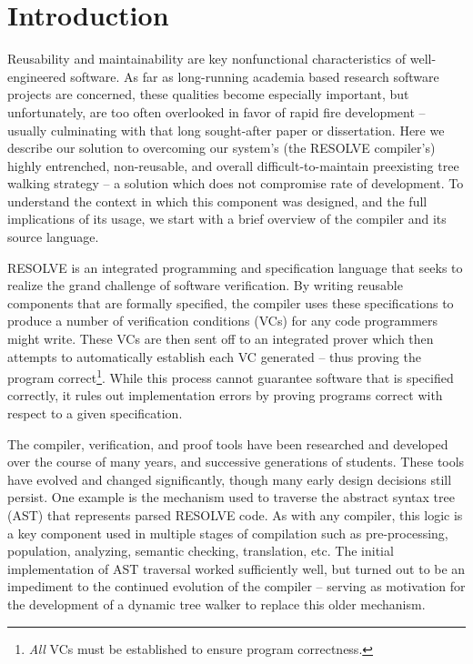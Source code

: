 \documentclass[times]{speauth}
\begin{document}

\section{Introduction}
\vspace{-2pt}
Reusability and maintainability are key nonfunctional characteristics of well-engineered software. As far as long-running academia based research software projects are concerned, these qualities become especially important, but unfortunately, are too often overlooked in favor of rapid fire development -- usually culminating with that long sought-after paper or dissertation. Here we describe our solution to overcoming our system's (the RESOLVE compiler's) highly entrenched, non-reusable, and overall difficult-to-maintain preexisting tree walking strategy -- a solution which does not compromise rate of development. To understand the context in which this component was designed, and the full implications of its usage, we start with a brief overview of the compiler and its source language.

RESOLVE is an integrated programming and specification language that seeks to realize the grand challenge of software verification. By writing reusable components that are formally specified, the compiler uses these specifications to produce a number of verification conditions (VCs) for any code programmers might write. These VCs are then sent off to an integrated prover which then attempts to automatically establish each VC generated -- thus proving the program correct\footnote{\textit{All} VCs must be established to ensure program correctness.}. While this process cannot guarantee software that is specified correctly, it rules out implementation errors by proving programs correct with respect to a given specification.

The compiler, verification, and proof tools have been researched and developed over the course of many years, and successive generations of students. These tools have evolved and changed significantly, though many early design decisions still persist. One example is the mechanism used to traverse the abstract syntax tree (AST) that represents parsed RESOLVE code. As with any compiler, this logic is a key component used in multiple stages of compilation such as pre-processing, population, analyzing, semantic checking, translation, etc. The initial implementation of AST traversal worked sufficiently well, but turned out to be an impediment to the continued evolution of the compiler -- serving as motivation for the development of a dynamic tree walker to replace this older mechanism.
\end{document}
